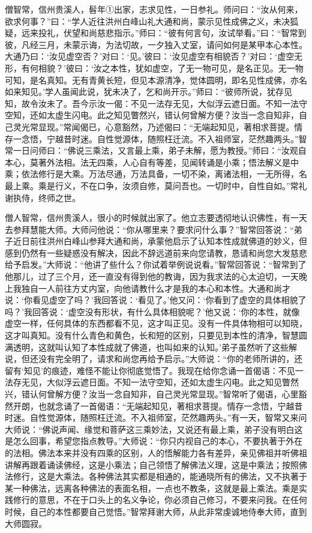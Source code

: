 \documentclass[12pt,twoside,openany]{book}
\newcommand{\kai}[1]{{\CJKfamily{kai}#1}}
\begin{document}
僧智常，信州贵溪人，髫年①出家，志求见性，一日参礼。师问曰：“汝从何来，欲求何事？”曰：“学人近往洪州白峰山礼大通和尚，蒙示见性成佛之义，未决狐疑，远来投礼，伏望和尚慈悲指示。”师曰：“彼有何言句，汝试举看。”曰：“智常到彼，凡经三月，未蒙示诲，为法切故，一夕独入丈室，请问如何是某甲本心本性。大通乃曰：‘汝见虚空否？’对曰：‘见。’彼曰：‘汝见虚空有相貌否？’对曰：‘虚空无形，有何相貌？’彼曰：‘汝之本性，犹如虚空，了无一物可见，是名正见。无一物可知，是名真知。无有青黄长短，但见本源清净，觉体圆明，即名见性成佛，亦名如来知见。’学人虽闻此说，犹未决了，乞和尚开示。”师曰：“彼师所说，犹存见知，故令汝未了。吾今示汝一偈：不见一法存无见，大似浮云遮日面。不知一法守空知，还如太虚生闪电。此之知见瞥然兴，错认何曾解方便？汝当一念自知非，自己灵光常显现。”常闻偈已，心意豁然，乃述偈曰：“无端起知见，著相求菩提。情存一念悟，宁越昔时迷。自性觉源体，随照枉迁流。不入祖师室，茫然趣两头。”智常一日问师曰：“佛说三乘法，又言最上乘，弟子未解，愿为教授。”师曰：“汝观自本心，莫著外法相。法无四乘，人心自有等差，见闻转诵是小乘；悟法解义是中乘；依法修行是大乘。万法尽通，万法具备，一切不染，离诸法相，一无所得，名最上乘。乘是行义，不在口争，汝须自修，莫问吾也。一切时中，自性自如。”常礼谢执侍，终师之世。

\kai{僧人智常，信州贵溪人，很小的时候就出家了。他立志要透彻地认识佛性，有一天去参拜慧能大师。大师问他说：“你从哪里来？要求问什么事？”智常回答说：“弟子近日前往洪州白峰山参拜大通和尚，承蒙他启示了认知本性成就佛道的妙义，但感到仍然有一些疑惑没有解决，因此不辞远道前来向您请教，恳请和尚您大发慈悲给予启发。”大师说：“他讲了些什么？你试着举例说说看。”智常回答说：“智常到了他那儿，过了三个月，还一直没有得到他的教诲，因为我求法的心太迫切，一天晚上我独自一人前往方丈内室，向他请教什么才是我的本心和本性。大通和尚才说：‘你看见虚空了吗？’我回答说：‘看见了。’他又问：‘你看到了虚空的具体相貌了吗？’我回答说：‘虚空没有形状，有什么具体相貌呢？’他又说：‘你的本性，就像虚空一样，任何具体的东西都看不见，这才叫正见。没有一件具体物相可以知晓，这才叫真知。没有什么青色和黄色，长和短的区别，只要见到本性的清净，智慧圆满透明，这就叫认知了本性成就了佛道，也叫如来的认知。’弟子虽然听了这些解说，但还没有完全明了，请求和尚您再给予启示。”大师说：“你的老师所讲的，还留有‘知见’的痕迹，难怪不能让你彻底觉悟了。我现在给你念诵一首偈语：不见一法存无见，大似浮云遮日面。不知一法守空知，还如太虚生闪电。此之知见瞥然兴，错认何曾解方便？汝当一念自知非，自己灵光常显现。”智常听了偈语，心里豁然开朗，也就念诵了一首偈语：“无端起知见，著相求菩提。情存一念悟，宁越昔时迷。自性觉源体，随照枉迁流。不入祖师室，茫然趣两头。”有一天，智常又来问大师说：“佛说声闻、缘觉和菩萨这三乘妙法，又说还有最上乘，弟子没有明白这是怎么回事，希望您指点教导。”大师说：“你只内视自己的本心，不要执著于外在的法相。佛法本来并没有四乘的区别，人的悟解能力各有差异，亲见佛祖并听佛祖讲解再跟着诵读佛经，这是小乘法；自己领悟了解佛法义理，这是中乘法；按照佛法修行，这是大乘法。各种佛法其实都是相通的，能通晓所有的佛法，又不执著于某一种佛法，远离各种佛法的表面名相，一点也不教条，这就是最上乘法。乘是实践修行的意思，不在于口头上的名义争论，你必须自己修习，不要来问我。在任何时候，自己的本性都要自己觉悟。”智常拜谢大师，从此非常虔诚地侍奉大师，直到大师圆寂。}
\end{document}
